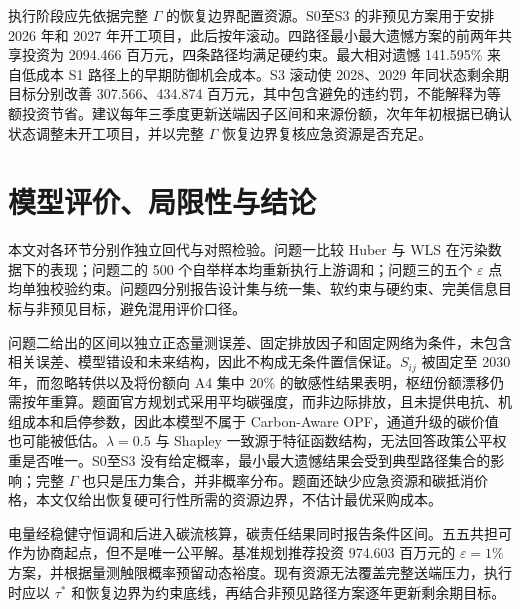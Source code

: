 \documentclass[UTF8,a4paper,zihao=-4,fontset=fandol]{ctexart}
\begin{document}
执行阶段应先依据完整 $\Gamma$ 的恢复边界配置资源。S0至S3 的非预见方案用于安排 2026 年和 2027 年开工项目，此后按年滚动。四路径最小最大遗憾方案的前两年共享投资为 2094.466 百万元，四条路径均满足硬约束。最大相对遗憾 141.595\% 来自低成本 S1 路径上的早期防御机会成本。S3 滚动使 2028、2029 年同状态剩余期目标分别改善 307.566、434.874 百万元，其中包含避免的违约罚，不能解释为等额投资节省。建议每年三季度更新送端因子区间和来源份额，次年年初根据已确认状态调整未开工项目，并以完整 $\Gamma$ 恢复边界复核应急资源是否充足。

\section{模型评价、局限性与结论}

本文对各环节分别作独立回代与对照检验。问题一比较 Huber 与 WLS 在污染数据下的表现；问题二的 500 个自举样本均重新执行上游调和；问题三的五个 $\varepsilon$ 点均单独校验约束。问题四分别报告设计集与统一集、软约束与硬约束、完美信息目标与非预见目标，避免混用评价口径。

问题二给出的区间以独立正态量测误差、固定排放因子和固定网络为条件，未包含相关误差、模型错设和未来结构，因此不构成无条件置信保证。$S_{ij}$ 被固定至 2030 年，而忽略转供以及将份额向 A4 集中 20\% 的敏感性结果表明，枢纽份额漂移仍需按年重算。题面官方规划式采用平均碳强度，而非边际排放，且未提供电抗、机组成本和启停参数，因此本模型不属于 Carbon-Aware OPF，通道升级的碳价值也可能被低估。$\lambda=0.5$ 与 Shapley 一致源于特征函数结构，无法回答政策公平权重是否唯一。S0至S3 没有给定概率，最小最大遗憾结果会受到典型路径集合的影响；完整 $\Gamma$ 也只是压力集合，并非概率分布。题面还缺少应急资源和碳抵消价格，本文仅给出恢复硬可行性所需的资源边界，不估计最优采购成本。

电量经稳健守恒调和后进入碳流核算，碳责任结果同时报告条件区间。五五共担可作为协商起点，但不是唯一公平解。基准规划推荐投资 974.603 百万元的 $\varepsilon=1\%$ 方案，并根据量测触限概率预留动态裕度。现有资源无法覆盖完整送端压力，执行时应以 $\tau^*$ 和恢复边界为约束底线，再结合非预见路径方案逐年更新剩余期目标。
\end{document}

